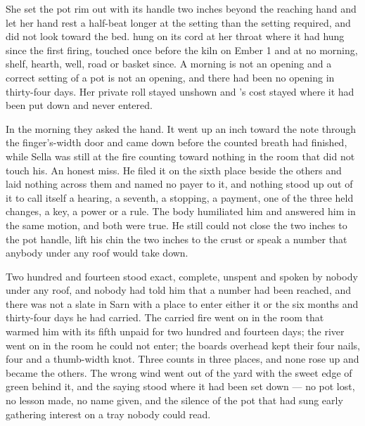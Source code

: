 She set the pot rim out with its handle two inches beyond the reaching hand and let her hand rest a half-beat longer at the setting than the setting required, and did not look toward the bed.  hung on its cord at her throat where it had hung since the first firing, touched once before the kiln on Ember 1 and at no morning, shelf, hearth, well, road or basket since. A morning is not an opening and a correct setting of a pot is not an opening, and there had been no opening in thirty-four days. Her private roll stayed unshown and 's cost stayed where it had been put down and never entered.

\scenebreak

In the morning they asked the hand. It went up an inch toward the note through the finger's-width door and came down before the counted breath had finished, while Sella was still at the fire counting toward nothing in the room that did not touch his. An honest miss. He filed it on the sixth place beside the others and laid nothing across them and named no payer to it, and nothing stood up out of it to call itself a hearing, a seventh, a stopping, a payment, one of the three held changes, a key, a power or a rule. The body humiliated him and answered him in the same motion, and both were true. He still could not close the two inches to the pot handle, lift his chin the two inches to the crust or speak a number that anybody under any roof would take down.

Two hundred and fourteen stood exact, complete, unspent and spoken by nobody under any roof, and nobody had told him that a number had been reached, and there was not a slate in Sarn with a place to enter either it or the six months and thirty-four days he had carried. The carried fire went on in the room that warmed him with its fifth unpaid for two hundred and fourteen days; the river went on in the room he could not enter; the boards overhead kept their four nails, four and a thumb-width knot. Three counts in three places, and none rose up and became the others. The wrong wind went out of the yard with the sweet edge of green behind it, and the saying stood where it had been set down --- no pot lost, no lesson made, no name given, and the silence of the pot that had sung early gathering interest on a tray nobody could read.
